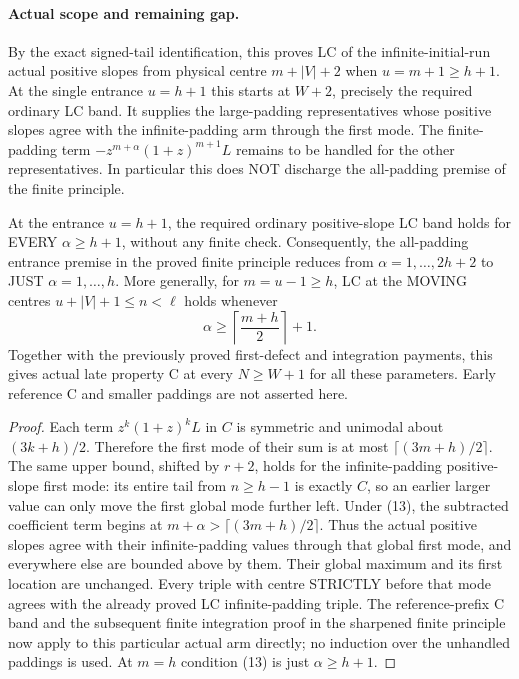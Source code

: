 \paragraph{Actual scope and remaining gap.}
By the exact signed-tail identification, this proves LC of the
infinite-initial-run actual positive slopes from physical centre
$m+|V|+2$ when $u=m+1\ge h+1$. At the single entrance $u=h+1$
this starts at $W+2$, precisely the required ordinary LC band.
It supplies the large-padding representatives whose positive slopes
agree with the infinite-padding arm through the first mode.
The finite-padding term $-z^{m+\alpha}(1+z)^{m+1}L$ remains to
be handled for the other representatives. In particular this does
NOT discharge the all-padding premise of the finite principle.

\begin{corollary}
At the entrance $u=h+1$, the required ordinary positive-slope LC
band holds for EVERY $\alpha\ge h+1$, without any finite check.
Consequently, the all-padding entrance premise in the proved finite
principle reduces from $\alpha=1,\ldots,2h+2$ to JUST
$\alpha=1,\ldots,h$.
More generally, for $m=u-1\ge h$, LC at the MOVING centres
$u+|V|+1\le n<\ell$ holds whenever
\[
               \alpha\ge\left\lceil\frac{m+h}{2}\right\rceil+1.
                                                               \tag{13}
\]
Together with the previously proved first-defect and integration
payments, this gives actual late property C at every $N\ge W+1$
for all these parameters. Early reference C and smaller paddings
are not asserted here.
\end{corollary}
\begin{proof}
Each term $z^k(1+z)^k L$ in $C$ is symmetric and unimodal about
$(3k+h)/2$. Therefore the first mode of their sum is at most
$\lceil(3m+h)/2\rceil$. The same upper bound, shifted by $r+2$,
holds for the infinite-padding positive-slope first mode: its
entire tail from $n\ge h-1$ is exactly $C$, so an earlier larger
value can only move the first global mode further left.
Under (13), the subtracted coefficient term begins at
$m+\alpha>\lceil(3m+h)/2\rceil$. Thus the actual positive
slopes agree with their infinite-padding values through that
global first mode, and everywhere else are bounded above by them.
Their global maximum and its first location are unchanged.
Every triple with centre STRICTLY before that mode agrees with
the already proved LC infinite-padding triple.
The reference-prefix C band and the subsequent finite integration
proof in the sharpened finite principle now apply to this particular
actual arm directly; no induction over the unhandled paddings is used.
At $m=h$ condition (13) is just $\alpha\ge h+1$.
\end{proof}

